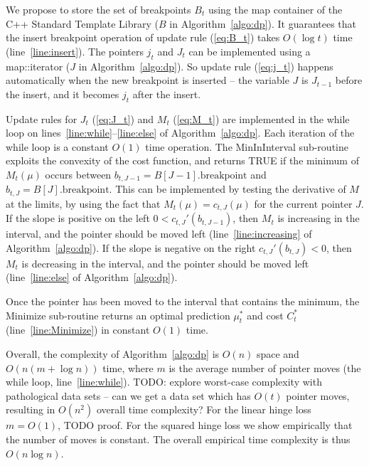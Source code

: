 \documentclass{article}
\begin{document}
We propose to store the set of breakpoints $B_t$ using the map
container of the C++ Standard Template Library ($B$ in
Algorithm~\ref{algo:dp}). It guarantees that the insert breakpoint
operation of update rule (\ref{eq:B_t}) takes $O(\log t)$ time
(line~\ref{line:insert}). The pointers $j_t$ and $J_t$ can be implemented
using a map::iterator ($J$ in Algorithm~\ref{algo:dp}). So update rule
(\ref{eq:j_t}) happens automatically when the new breakpoint is
inserted -- the variable $J$ is $J_{t-1}$ before the insert, and it
becomes $j_t$ after the insert.

Update rules for $J_t$ (\ref{eq:J_t}) and $M_t$ (\ref{eq:M_t}) are
implemented in the while loop on
lines~\ref{line:while}--\ref{line:else} of
Algorithm~\ref{algo:dp}. Each iteration of the while loop is a
constant $O(1)$ time operation. The MinInInterval sub-routine exploits
the convexity of the cost function, and returns TRUE if the minimum of
$M_t(\mu)$ occurs between $b_{t,J-1}=B[J-1].\text{breakpoint}$ and
$b_{t,J}=B[J].\text{breakpoint}$. This can be implemented by testing
the derivative of $M$ at the limits, by using the fact that
$M_t(\mu)=c_{t,J}(\mu)$ for the current pointer $J$. If the slope is
positive on the left $0<c_{t,J}'(b_{t,J-1})$, then $M_t$ is increasing
in the interval, and the pointer should be moved left
(line~\ref{line:increasing} of Algorithm~\ref{algo:dp}). If the slope
is negative on the right $c_{t,J}'(b_{t,J})<0$, then $M_t$ is
decreasing in the interval, and the pointer should be moved left
(line~\ref{line:else} of Algorithm~\ref{algo:dp}).

Once the pointer has been moved to the interval that contains the
minimum, the Minimize sub-routine returns an optimal prediction
$\mu_t^*$ and cost $C_t^*$ (line~\ref{line:Minimize}) in constant
$O(1)$ time.

Overall, the complexity of Algorithm~\ref{algo:dp} is $O(n)$ space and
$O(n (m + \log n))$ time, where $m$ is the average number of pointer moves
(the while loop, line~\ref{line:while}). TODO: explore worst-case
complexity with pathological data sets -- can we get a data set which
has $O(t)$ pointer moves, resulting in $O(n^2)$ overall time
complexity? For the linear hinge loss $m=O(1)$, TODO proof. For the
squared hinge loss we show empirically that the number of moves is
constant. The overall empirical time complexity is thus $O(n\log n)$.
\end{document}
